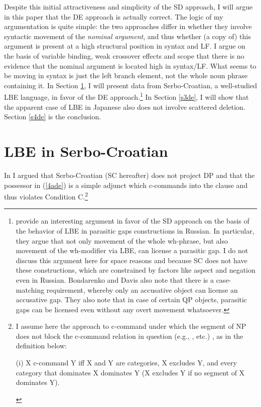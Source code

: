 \documentclass[
    output=paper,
    colorlinks,
    citecolor=brown,
]{langscibook}
\begin{document}
Despite this initial attractiveness and simplicity of the SD approach, I will argue in this paper that the DE approach is actually correct. The logic of my argumentation is quite simple: the two approaches differ in whether they involve syntactic movement of the \textit{nominal argument}, and thus whether (a copy of) this argument is present at a high structural position in syntax and LF. I argue on the basis of variable binding, weak crossover effects and scope that there is no evidence that the nominal argument is located high in syntax/LF. What seems to be moving in syntax is just the left branch element, not the whole noun phrase containing it. In Section \ref{s2de}, I will present data from Serbo-Croatian, a well-studied LBE language, in favor of the DE approach.\footnote{\citet{BondarenkoColin2018} provide an interesting argument in favor of the SD approach on the basis of the behavior of LBE in parasitic gaps constructions in Russian. In particular, they argue that not only movement of the whole wh-phrase, but also movement of the wh-modifier via LBE, can license a parasitic gap. I do not discuss this argument here for space reasons and because SC does not have these constructions, which are constrained by factors like aspect and negation even in Russian. Bondarenko and Davis also note that there is a case-matching requirement, whereby only an accusative object can license an accusative gap. They also note that in case of certain QP objects, parasitic gaps can be licensed even without any overt movement whatsoever.} In Section \ref{s3de}, I will show that the apparent case of LBE in Japanese \citep{TakahashiFunakoshi2013} also does not involve scattered deletion. Section \ref{s4de} is the conclusion. 

\section{LBE in Serbo-Croatian } \label{s2de}

In \citet{Despić2011,Despić2013} I argued that Serbo-Croatian (SC hereafter) does not project DP and that the possessor in (\ref{4ade}) is a simple adjunct which c-commands into the clause and thus violates Condition C.\footnote{I assume here the approach to c-command under which the segment of NP does not block the c-command relation in question (e.g., \citeauthor{Kayne1994}, \citeauthor{Despić2011} \citeyear{Despić2011} etc.) , as in the definition below:
\begin{exe}
\ex (i)	X c-command Y iff X and Y are categories, X excludes Y, and every category that dominates X dominates Y (X excludes Y if no segment of X dominates Y).  
\end{exe}}
\end{document}
